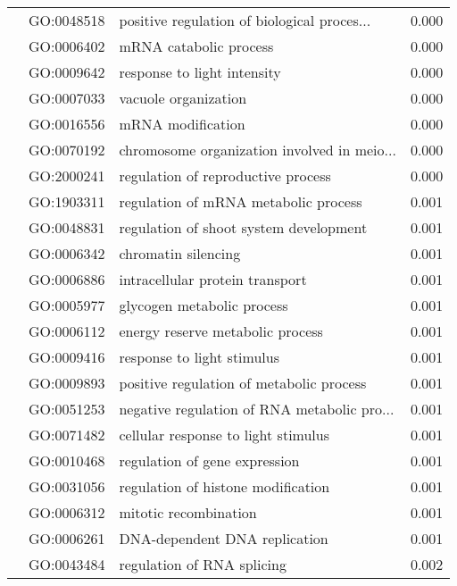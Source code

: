 \begin{longtable}{lllr}
   & GO:0048518 &  positive regulation of biological proces... &         0.000 \\
   & GO:0006402 &                       mRNA catabolic process &         0.000 \\
   & GO:0009642 &                  response to light intensity &         0.000 \\
   & GO:0007033 &                         vacuole organization &         0.000 \\
   & GO:0016556 &                            mRNA modification &         0.000 \\
   & GO:0070192 &  chromosome organization involved in meio... &         0.000 \\
   & GO:2000241 &           regulation of reproductive process &         0.000 \\
   & GO:1903311 &         regulation of mRNA metabolic process &         0.001 \\
   & GO:0048831 &       regulation of shoot system development &         0.001 \\
   & GO:0006342 &                          chromatin silencing &         0.001 \\
   & GO:0006886 &              intracellular protein transport &         0.001 \\
   & GO:0005977 &                   glycogen metabolic process &         0.001 \\
   & GO:0006112 &             energy reserve metabolic process &         0.001 \\
   & GO:0009416 &                   response to light stimulus &         0.001 \\
   & GO:0009893 &     positive regulation of metabolic process &         0.001 \\
   & GO:0051253 &  negative regulation of RNA metabolic pro... &         0.001 \\
   & GO:0071482 &          cellular response to light stimulus &         0.001 \\
   & GO:0010468 &                regulation of gene expression &         0.001 \\
   & GO:0031056 &           regulation of histone modification &         0.001 \\
   & GO:0006312 &                        mitotic recombination &         0.001 \\
   & GO:0006261 &                DNA-dependent DNA replication &         0.001 \\
   & GO:0043484 &                   regulation of RNA splicing &         0.002 \\

\end{longtable}
